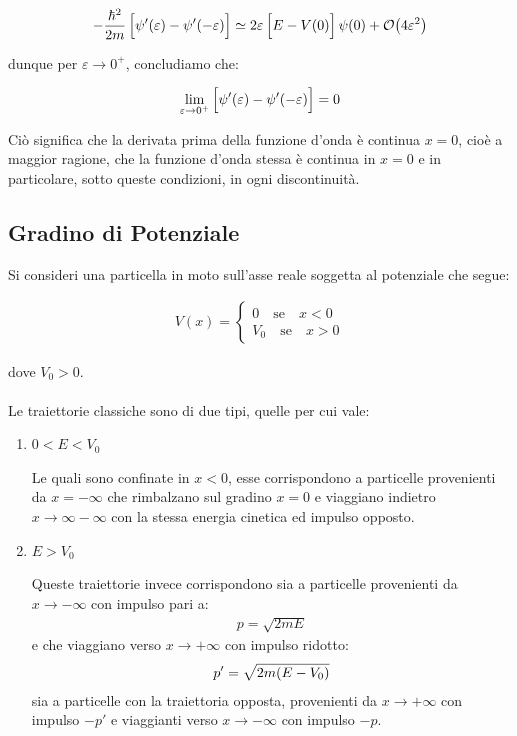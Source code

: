 \begin{align*}
	- \frac{\hbar^2}{2m} \, \qty\Big[\psi'(\varepsilon) - \psi'(-\varepsilon)] \simeq 2\varepsilon \, \qty\Big[E - V(0)] \, \psi(0) + \order{4\varepsilon^2}
\end{align*}

	dunque per $\varepsilon \to 0^+$, concludiamo che:
	
\begin{align*}
	\lim_{\varepsilon \to 0^+} \qty\Big[\psi'(\varepsilon) - \psi'(- \varepsilon)] = 0
\end{align*}

	Ciò significa che la derivata prima della funzione d'onda è continua $x = 0$, cioè a maggior ragione, che la funzione d'onda stessa è continua in $x = 0$ e in particolare, sotto queste condizioni, in ogni discontinuità.

\subsection{Gradino di Potenziale}

	Si consideri una particella in moto sull'asse reale soggetta al potenziale che segue:
	
\begin{align*}
	V(x) = \begin{cases}
		0 \quad \text{se} \quad x < 0 \\
		V_0  \quad \text{se}  \quad x > 0
	\end{cases}
\end{align*}

	dove $V_0 > 0$.
	\\
	\\
 	Le traiettorie classiche sono di due tipi, quelle per cui vale:
\begin{enumerate}[label=\arabic*)]

	\item $0 < E < V_0$
		
		Le quali sono confinate in $x < 0$, esse corrispondono a particelle provenienti da $x = -\infty$ che rimbalzano sul gradino $x = 0$ e viaggiano indietro $x \to \infty - \infty$ con la stessa energia cinetica ed impulso opposto. 
		
	\item $E > V_0$
	
		Queste traiettorie invece corrispondono sia a particelle provenienti da $x \to - \infty$ con impulso pari a:
	\begin{align*}
		p = \sqrt{2mE}
	\end{align*}
		e che viaggiano verso $x \to +\infty$ con impulso ridotto:
	\begin{align*}
		p' = \sqrt{2m\qty(E - V_0)}
	\end{align*}
		sia a particelle con la traiettoria opposta, provenienti da $x \to +\infty$ con impulso $- p'$ e viaggianti verso $x \to -\infty$ con impulso $-p$. 
\end{enumerate}

